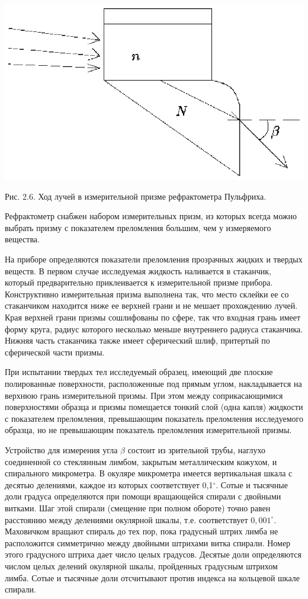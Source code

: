 \vskip 3mm
\centerline{\hbox{\includegraphics[scale=0.7]{Ris/ris_eps/ris2_06.eps}}}

\leftskip 0cm\centerline{\ris Рис. 2.6. Ход лучей в измерительной
призме рефрактометра Пульфриха.} \vskip 2mm Рефрактометр снабжен
набором измерительных призм, из которых всегда можно выбрать
призму с показателем преломления большим, чем у измеряемого
вещества.

На приборе определяются показатели преломления прозрачных жидких и
твердых веществ. В первом случае исследуемая жидкость наливается в
стаканчик, который предварительно приклеивается к измерительной
призме прибора. Конструктивно измерительная призма выполнена так,
что место склейки ее со стаканчиком находится ниже ее верхней
грани и не мешает прохождению лучей. Края верхней грани призмы
сошлифованы по сфере, так что входная грань имеет форму круга,
радиус которого несколько меньше внутреннего радиуса стаканчика.
Нижняя часть стаканчика также имеет сферический шлиф, притертый по
сферической части призмы.

При испытании твердых тел исследуемый образец, имеющий две плоские
полированные поверхности, расположенные под прямым углом,
накладывается на верхнюю грань измерительной призмы. При этом
между соприкасающимися поверхностями образца и призмы помещается
тонкий слой (одна капля) жидкости с показателем преломления,
превышающим показатель преломления исследуемого образца, но не
превышающим показатель преломления измерительной призмы.

Устройство для измерения угла $\beta$ состоит из зрительной трубы,
наглухо соединенной со стеклянным лимбом, закрытым металлическим
кожухом, и спирального микрометра. В окуляре микрометра имеется
вертикальная шкала с десятью делениями, каждое из которых
соответствует 0,1$^{\circ}$. Сотые и тысячные доли градуса
определяются при помощи вращающейся спирали с двойными витками.
Шаг этой спирали (смещение при полном обороте) точно равен
расстоянию между делениями окулярной шкалы, т.е. соответствует
$0,001^{\circ}$. Маховичком вращают спираль до тех пор, пока
градусный штрих лимба не расположится симметрично между двойными
штрихами витка спирали. Номер этого градусного штриха дает число
целых градусов. Десятые доли определяются числом целых делений
окулярной шкалы, пройденных градусным штрихом лимба. Сотые и
тысячные доли отсчитывают против индекса на кольцевой шкале
спирали.

